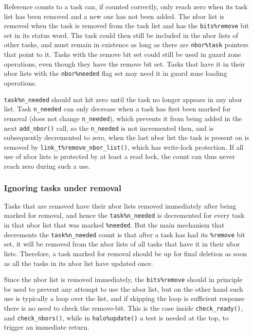 \documentclass[paper=a4,fontsize=11pt]{scrartcl}
\numberwithin{equation}{section}		%
\numberwithin{figure}{section}			%
\numberwithin{table}{section}				%
\newcommand{\codecolor}{\color{Blue}}
\newcommand{\Code}[1]{{\codecolor\texttt{#1}}}
\def\checkready{\Code{check\_ready()}}
\def\checknbors{\Code{check\_nbors()}}
\begin{document}
Reference counts to a task can, if counted correctly, only reach zero when its task list has been removed and a new one has not been added.  The nbor list is removed when the task is removed from the task list and has the \Code{bits\%remove} bit set in its status word.  The task could then still be included in the nbor lists of other tasks, and must remain in existence as long as there are \Code{nbor\%task} pointers that point to it.  Tasks with the remove bit set could still be used in guard zone operations, even though they have the remove bit set.  Tasks that have it in their nbor lists with the \Code{nbor\%needed} flag set may need it in guard zone loading operations.

\verb|task%n_needed| should not hit zero until the task no longer appears in any nbor list.  Task \verb|n_needed| can only decrease when a task has first been marked for removal (does not change \verb|n_needed|), which prevents it from being added in the next \verb|add_nbor()| call, so the \verb|n_needed| is not incremented then, and is subsequently decremented to zero, when the last nbor list the task is present on is removed by \verb|link_t%remove_nbor_list()|, which has write-lock protection.  If all use of nbor lists is protected by at least a read lock, the count can thus never reach zero during such a use.

\subsubsection{Ignoring tasks under removal}
Tasks that are removed have their nbor lists removed immediately after being marked for removal, and hence the \verb|task%n_needed| is decremented for every task in that nbor list that was marked \verb|%needed|.  But the main mechanism that decrements the \verb|task%n_needed| count is that after a task has had its \verb|%remove| bit set, it will be removed from the nbor lists of all tasks that have it in their nbor lists.  Therefore, a task marked for removal should be up for final deletion as soon as all the tasks in its nbor list have updated once.

Since the nbor list is removed immediately, the \verb|bits%remove| should in principle be used to prevent any attempt to use the nbor list, but on the other hand such use is typically a loop over the list, and if skipping the loop is sufficient response there is no need to check the remove-bit.  This is the case inside \checkready{}, and \checknbors{}, while in \verb|halo%update()| a test is needed at the top, to trigger an immediate return.
\end{document}
